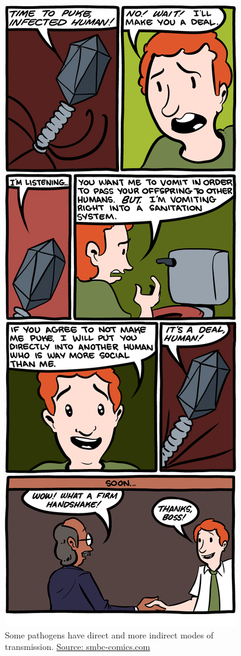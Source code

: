 \documentclass[]{article}
\theoremstyle{definition}
\theoremstyle{definition}
\theoremstyle{definition}
\theoremstyle{remark}
\begin{document}
\begin{figure}
\centering
\includegraphics{./images/smbctransmissionmode.png}
\caption{Some pathogens have direct and more indirect modes of
transmission. \href{http://www.smbc-comics.com/}{Source:
smbc-comics.com}}
\end{figure}
\end{document}
